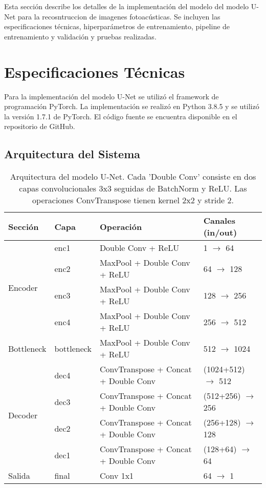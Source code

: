 Esta sección describe los detalles de la implementación del modelo del modelo U-Net para la recosntruccion de imagenes fotoacústicas. Se incluyen las especificaciones técnicas, hiperparámetros de entrenamiento, pipeline de entrenamiento y validación y pruebas realizadas.


\section{Especificaciones Técnicas}
Para la implementación del modelo U-Net se utilizó el framework de programación PyTorch. La implementación se realizó en Python 3.8.5 y se utilizó la versión 1.7.1 de PyTorch. El código fuente se encuentra disponible en el repositorio de GitHub.
\subsection{Arquitectura del Sistema}
\begin{table}[H]
    \centering
    \begin{tabular}{llll}
    \hline
    \textbf{Sección} & \textbf{Capa} & \textbf{Operación} & \textbf{Canales (in/out)} \\
    \hline
    \multirow{4}{*}{Encoder} 
    & enc1 & Double Conv + ReLU & 1 $\rightarrow$ 64 \\
    & enc2 & MaxPool + Double Conv + ReLU & 64 $\rightarrow$ 128 \\
    & enc3 & MaxPool + Double Conv + ReLU & 128 $\rightarrow$ 256 \\
    & enc4 & MaxPool + Double Conv + ReLU & 256 $\rightarrow$ 512 \\
    \hline
    Bottleneck & bottleneck & MaxPool + Double Conv + ReLU & 512 $\rightarrow$ 1024 \\
    \hline
    \multirow{4}{*}{Decoder}
    & dec4 & ConvTranspose + Concat + Double Conv & (1024+512) $\rightarrow$ 512 \\
    & dec3 & ConvTranspose + Concat + Double Conv & (512+256) $\rightarrow$ 256 \\
    & dec2 & ConvTranspose + Concat + Double Conv & (256+128) $\rightarrow$ 128 \\
    & dec1 & ConvTranspose + Concat + Double Conv & (128+64) $\rightarrow$ 64 \\
    \hline
    Salida & final & Conv 1x1 & 64 $\rightarrow$ 1 \\
    \hline
    \end{tabular}
    \caption{Arquitectura del modelo U-Net. Cada 'Double Conv' consiste en dos capas convolucionales 3x3 seguidas de BatchNorm y ReLU. Las operaciones ConvTranspose tienen kernel 2x2 y stride 2.}
    \label{tab:unet_architecture}
\end{table}

